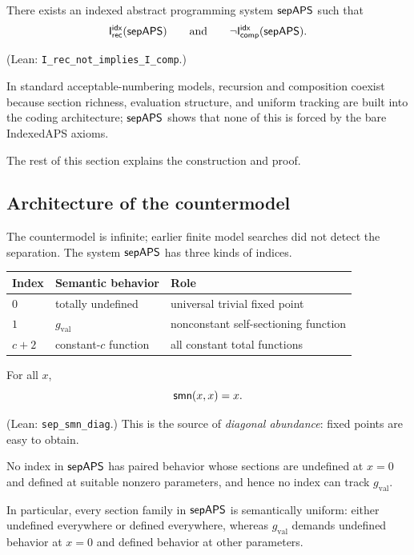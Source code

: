 \documentclass[11pt]{article}
\begin{document}
\begin{theorem}\label{thm:separation}
There exists an indexed abstract programming system \(\mathsf{sepAPS}\) such that
\[
\mathsf{I}_{\mathsf{rec}}^{\mathsf{idx}}(\mathsf{sepAPS})
\qquad\text{and}\qquad
\neg \mathsf{I}_{\mathsf{comp}}^{\mathsf{idx}}(\mathsf{sepAPS}).
\]
\end{theorem}
(Lean: \texttt{I\_rec\_not\_implies\_I\_comp}.)

\begin{remark}
In standard acceptable-numbering models, recursion and composition coexist because section richness, evaluation structure, and uniform tracking are built into the coding architecture; \(\mathsf{sepAPS}\) shows that none of this is forced by the bare IndexedAPS axioms.
\end{remark}

The rest of this section explains the construction and proof.

\subsection{Architecture of the countermodel}

The countermodel is infinite; earlier finite model searches did not detect the separation.  The system \(\mathsf{sepAPS}\) has three kinds of indices.

\begin{center}
\begin{tabular}{lll}
\toprule
Index & Semantic behavior & Role \\
\midrule
\(0\) & totally undefined & universal trivial fixed point \\
\(1\) & \(g_{\mathrm{val}}\) & nonconstant self-sectioning function \\
\(c+2\) & constant-\(c\) function & all constant total functions \\
\bottomrule
\end{tabular}
\end{center}

\begin{proposition}\label{prop:diag-identity}
For all \(x\),
\[
\mathsf{smn}(x,x)=x.
\]
\end{proposition}
(Lean: \texttt{sep\_smn\_diag}.)
This is the source of \emph{diagonal abundance}: fixed points are easy to obtain.

\begin{proposition}\label{prop:section-poverty}
No index in \(\mathsf{sepAPS}\) has paired behavior whose sections are undefined at \(x=0\) and defined at suitable nonzero parameters, and hence no index can track \(g_{\mathrm{val}}\).
\end{proposition}
In particular, every section family in \(\mathsf{sepAPS}\) is semantically uniform: either undefined everywhere or defined everywhere, whereas \(g_{\mathrm{val}}\) demands undefined behavior at \(x=0\) and defined behavior at other parameters.
\end{document}
